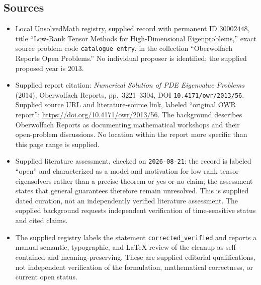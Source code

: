 \documentclass[11pt]{article}
\begin{document}
\subsection{Sources}
\begin{itemize}
\item Local UnsolvedMath registry, supplied record with permanent ID \(30002448\), title ``Low-Rank Tensor Methods for High-Dimensional Eigenproblems,'' exact source problem code \texttt{catalogue entry}, in the collection ``Oberwolfach Reports Open Problems.'' No individual proposer is identified; the supplied proposed year is \(2013\).
\item Supplied report citation: \emph{Numerical Solution of PDE Eigenvalue Problems} (2014), Oberwolfach Reports, pp.\ 3221--3304, DOI \texttt{10.4171/owr/2013/56}. Supplied source URL and literature-source link, labeled ``original OWR report'': \url{https://doi.org/10.4171/owr/2013/56}. The background describes Oberwolfach Reports as documenting mathematical workshops and their open-problem discussions. No location within the report more specific than this page range is supplied.
\item Supplied literature assessment, checked on \texttt{2026-08-21}: the record is labeled ``open'' and characterized as a model and motivation for low-rank tensor eigensolvers rather than a precise theorem or yes-or-no claim; the assessment states that general guarantees therefore remain unresolved. This is supplied dated curation, not an independently verified literature assessment. The supplied background requests independent verification of time-sensitive status and cited claims.
\item The supplied registry labels the statement \texttt{corrected\_verified} and reports a manual semantic, typographic, and LaTeX review of the cleanup as self-contained and meaning-preserving. These are supplied editorial qualifications, not independent verification of the formulation, mathematical correctness, or current open status.
\end{itemize}
\end{document}
